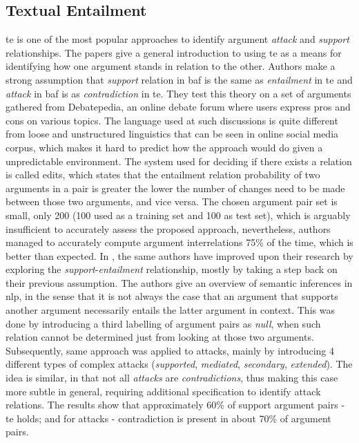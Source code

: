     \subsection{Textual Entailment}
        \gls{te} is one of the most popular approaches to identify argument \textit{attack} and \textit{support} relationships. The \autocite{Cabrio2012NaturalLA, Cabrio2012CombiningTE} papers give a general introduction to using \gls{te} as a means for identifying how one argument stands in relation to the other. Authors make a strong assumption that \textit{support} relation in \gls{baf} is the same as \textit{entailment} in \gls{te} and \textit{attack} in \gls{baf} is as \textit{contradiction} in \gls{te}. They test this theory on a set of arguments gathered from Debatepedia, an online debate forum where users express pros and cons on various topics. The language used at such discussions is quite different from loose and unstructured linguistics that can be seen in online social media corpus, which makes it hard to predict how the approach would do given a unpredictable environment. The system used for deciding if there exists a relation is called \gls{edits}, which states that the entailment relation probability of two arguments in a pair is greater the lower the number of changes need to be made between those two arguments, and vice versa. The chosen argument pair set is small, only 200 (100 used as a training set and 100 as test set), which is arguably insufficient to accurately assess the proposed approach, nevertheless, authors managed to accurately compute argument interrelations 75\% of the time, which is better than expected. In \autocite{Cabrio2013ANL, Cabrio2013DetectingBS}, the same authors have improved upon their research by exploring the \textit{support}-\textit{entailment} relationship, mostly by taking a step back on their previous assumption. The authors give an overview of semantic inferences in \gls{nlp}, in the sense that it is not always the case that an argument that supports another argument necessarily entails the latter argument in context. This was done by introducing a third labelling of argument pairs as \textit{null}, when such relation cannot be determined just from looking at those two arguments. Subsequently, same approach was applied to attacks, mainly by introducing 4 different types of complex attacks (\textit{supported}, \textit{mediated}, \textit{secondary}, \textit{extended}). The idea is similar, in that not all \textit{attacks} are \textit{contradictions}, thus making this case more subtle in general, requiring additional specification to identify attack relations. The results show that approximately 60\% of support argument pairs - \gls{te} holds; and for attacks - contradiction is present in about 70\% of argument pairs.
     
